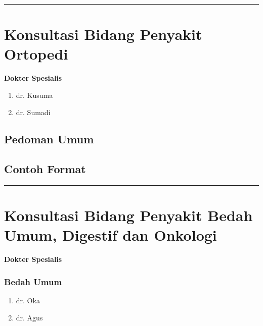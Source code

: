 \documentclass[
]{book}
\providecommand{\tightlist}{%
  \setlength{\itemsep}{0pt}\setlength{\parskip}{0pt}}
\begin{document}
\begin{center}\rule{0.5\linewidth}{0.5pt}\end{center}

\hypertarget{konsultasi-bidang-penyakit-ortopedi}{%
\section{Konsultasi Bidang Penyakit Ortopedi}\label{konsultasi-bidang-penyakit-ortopedi}}

\textbf{Dokter Spesialis}

\begin{enumerate}
\def\labelenumi{\arabic{enumi}.}
\tightlist
\item
  dr. Kusuma
\item
  dr. Sumadi
\end{enumerate}

\hypertarget{pedoman-umum-2}{%
\subsection{Pedoman Umum}\label{pedoman-umum-2}}

\hypertarget{contoh-format-2}{%
\subsection{Contoh Format}\label{contoh-format-2}}

\begin{center}\rule{0.5\linewidth}{0.5pt}\end{center}

\hypertarget{konsultasi-bidang-penyakit-bedah-umum-digestif-dan-onkologi}{%
\section{Konsultasi Bidang Penyakit Bedah Umum, Digestif dan Onkologi}\label{konsultasi-bidang-penyakit-bedah-umum-digestif-dan-onkologi}}

\textbf{Dokter Spesialis}

\hypertarget{bedah-umum}{%
\subsubsection{Bedah Umum}\label{bedah-umum}}

\begin{enumerate}
\def\labelenumi{\arabic{enumi}.}
\tightlist
\item
  dr. Oka
\item
  dr. Agus
\end{enumerate}
\end{document}
